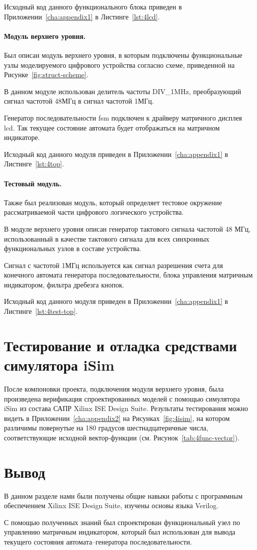 Исходный код данного функционального блока приведен в Приложении~\ref{cha:appendix1} в Листинге~\ref{lst:4lcd}.


\paragraph{Модуль верхнего уровня.}
Был описан модуль верхнего уровня, в которым подключены функциональные узлы моделируемого цифрового устройства согласно схеме, приведенной на Рисунке~\ref{fig:struct-scheme}.

В данном модуле использован делитель частоты DIV\_1MHz, преобразующий сигнал частотой 48МГц в сигнал частотой 1МГц.

Генератор последовательности fsm подключен к драйверу матричного дисплея lcd. Так текущее состояние автомата будет отображаться на матричном индикаторе.

Исходный код данного модуля приведен в Приложении~\ref{cha:appendix1} в Листинге~\ref{lst:4top}.

\paragraph{Тестовый модуль.}
Также был реализован модуль, который определяет тестовое окружение рассматриваемой части цифрового логического устройства. 

В модуле верхнего уровня описан генератор тактового сигнала частотой 48 МГц, использованный в качестве тактового сигнала для всех синхронных функциональных узлов в составе устройства. 

Сигнал с частотой 1МГц используется как сигнал разрешения счета для конечного автомата генератора последовательности, блока управления матричным индикатором, фильтра дребезга кнопок. 

Исходный код данного модуля приведен в Приложении~\ref{cha:appendix1} в Листинге~\ref{lst:4test-top}.


\section{Тестирование и отладка средствами симулятора iSim}
После компоновки проекта, подключения модуля верхнего уровня, была произведена верификация спроектированных моделей с помощью симулятора iSim из состава САПР Xilinx ISE Design Suite. Результаты тестирования можно видеть в Приложении~\ref{cha:appendix2} на Рисунках~\ref{fig:4isim}, на котором различимы повернутые на 180 градусов шестнадцатеричные числа, соответствующие исходной вектор-функции (см. Рисунок~\ref{tab:4func-vector}).


\section{Вывод}

В данном разделе нами были получены общие навыки работы с программным обеспечением Xilinx ISE Design Suite, изучены основы языка Verilog.

С помощью полученных знаний был спроектирован функциональный узел по управлению матричным индикатором, который был использован для вывода текущего состояния автомата--генератора последовательности.


